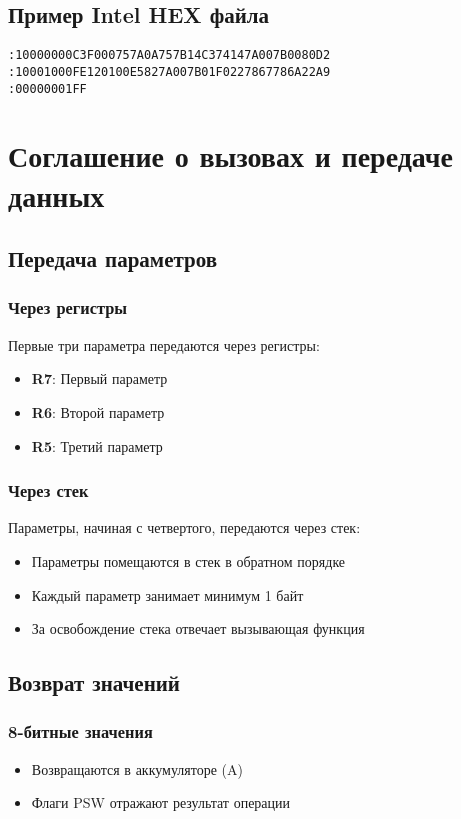 \documentclass[a4paper, 12pt]{article}
\begin{document}
\subsection{Пример Intel HEX файла}
\begin{verbatim}
:10000000C3F000757A0A757B14C374147A007B0080D2
:10001000FE120100E5827A007B01F0227867786A22A9
:00000001FF
\end{verbatim}

\section{Соглашение о вызовах и передаче данных}
\subsection{Передача параметров}
\subsubsection{Через регистры}
Первые три параметра передаются через регистры:
\begin{itemize}
    \item \textbf{R7}: Первый параметр
    \item \textbf{R6}: Второй параметр
    \item \textbf{R5}: Третий параметр
\end{itemize}

\subsubsection{Через стек}
Параметры, начиная с четвертого, передаются через стек:
\begin{itemize}
    \item Параметры помещаются в стек в обратном порядке
    \item Каждый параметр занимает минимум 1 байт
    \item За освобождение стека отвечает вызывающая функция
\end{itemize}

\subsection{Возврат значений}
\subsubsection{8-битные значения}
\begin{itemize}
    \item Возвращаются в аккумуляторе (A)
    \item Флаги PSW отражают результат операции
\end{itemize}
\end{document}
